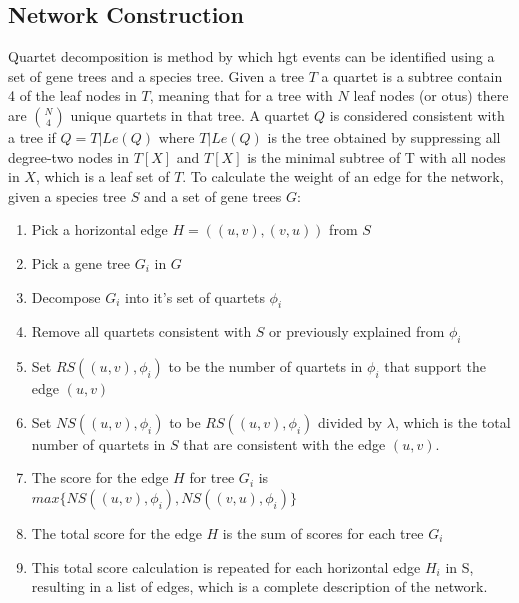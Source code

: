 \documentclass[12pt,letter]{article}
\begin{document}
\subsection*{Network Construction}
Quartet decomposition is method by which \ac{hgt} events can be identified using a set of gene trees and a species tree.
Given a tree $T$ a quartet is a subtree contain 4 of the leaf nodes in $T$, meaning that for a tree with $N$ leaf nodes (or \ac{otu}s) there are $\binom{N}{4}$ unique quartets in that tree.
A quartet $Q$ is considered consistent with a tree if $Q = T|Le(Q)$ where $T|Le(Q)$ is the tree obtained by suppressing all degree-two nodes in $T[X]$ and $T[X]$ is the minimal subtree of T with all nodes in $X$, which is a leaf set of $T$\citep{hide}.
To calculate the weight of an edge for the network, given a species tree $S$ and a set of gene trees $G$\citep{hide}:
\begin{enumerate}
    \item Pick a horizontal edge $H = ((u,v),(v,u))$ from $S$
    \item Pick a gene tree $G_i$ in $G$
    \item Decompose $G_i$ into it's set of quartets $\phi_i$
    \item Remove all quartets consistent with $S$ or previously explained from $\phi_i$
    \item Set $RS((u,v),\phi_i)$ to be the number of quartets in $\phi_i$ that support the edge $(u,v)$
    \item Set $NS((u,v),\phi_i)$ to be $RS((u,v),\phi_i)$ divided by $\lambda$, which is the total number of quartets in $S$ that are consistent with the edge $(u,v)$.
    \item The score for the edge $H$ for tree $G_i$ is $max\{NS((u,v),\phi_i),NS((v,u),\phi_i)\}$
    \item The total score for the edge $H$ is the sum of scores for each tree $G_i$
    \item This total score calculation is repeated for each horizontal edge $H_i$ in S, resulting in a list of edges, which is a complete description of the network.
\end{enumerate}
\end{document}
